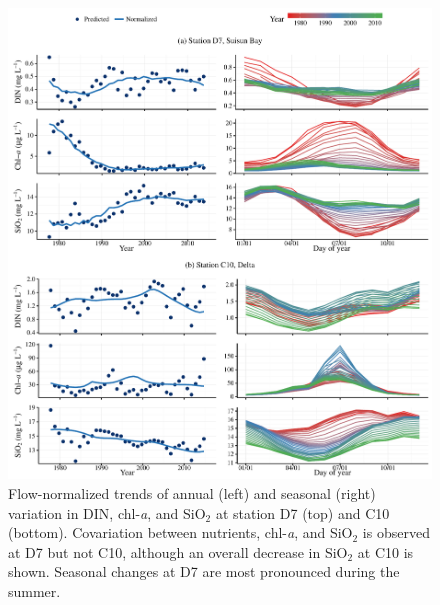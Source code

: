 \documentclass[journal = esthag, manuscript = article]{achemso}\usepackage[]{graphicx}\usepackage[]{color}
\makeatletter
\def\maxwidth{ %
  \ifdim\Gin@nat@width>\linewidth
    \linewidth
  \else
    \Gin@nat@width
  \fi
}
\makeatother
\begin{document}
\begin{figure}[!ht]

{\centering \includegraphics[width=\maxwidth]{figs/d7c10trnds-1} 

}

\caption{Flow-normalized trends of annual (left) and seasonal (right) variation in DIN, chl-{\it\footnotesize a}, and SiO$_2$ at station D7 (top) and C10 (bottom).  Covariation between nutrients, chl-{\it\footnotesize a}, and SiO$_2$ is observed at D7 but not C10, although an overall decrease in SiO$_2$ at C10 is shown.  Seasonal changes at D7 are most pronounced during the summer.}\label{fig:d7c10trnds}
\end{figure}



\clearpage
\end{document}
